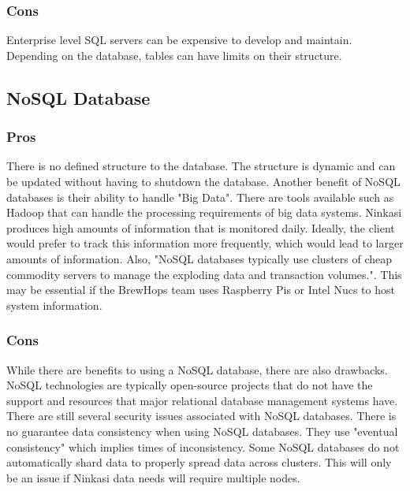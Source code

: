 \documentclass[draftclsnofoot,onecolumn,letterpaper,10pt,compsoc]{IEEEtran}
\begin{document}
        \subsubsection{Cons}
            Enterprise level SQL servers can be expensive to develop and maintain.
            Depending on the database, tables can have limits on their structure\cite{TechwallaSQLCons}.

        
	\subsection{NoSQL Database}
        \subsubsection{Pros}
            There is no defined structure to the database.
            The structure is dynamic and can be updated without having to shutdown the database\cite{MongoDBProsCons}.
            Another benefit of NoSQL databases is their ability to handle "Big Data".
            There are tools available such as Hadoop that can handle the processing requirements of big data systems\cite{NoSQLProsCons}.
            Ninkasi produces high amounts of information that is monitored daily.
            Ideally, the client would prefer to track this information more frequently, which would lead to larger amounts of information.
            Also, "NoSQL databases typically use clusters of cheap commodity servers to manage the exploding data and transaction volumes."\cite{NoSQLProsCons}.
            This may be essential if the BrewHops team uses Raspberry Pis or Intel Nucs to host system information.
            
    
        \subsubsection{Cons}
            While there are benefits to using a NoSQL database, there are also drawbacks.
            NoSQL technologies are typically open-source projects that do not have the support and resources that major relational database management systems have\cite{NoSQLProsCons}.
            There are still several security issues associated with NoSQL databases\cite{NoSQLSecurityIssues}.
            There is no guarantee data consistency when using NoSQL databases\cite{ChannelFutures}.
            They use "eventual consistency" which implies times of inconsistency.
            Some NoSQL databases do not automatically shard data to properly spread data across clusters\cite{ChannelFutures}.
            This will only be an issue if Ninkasi data needs will require multiple nodes.
        
\end{document}
